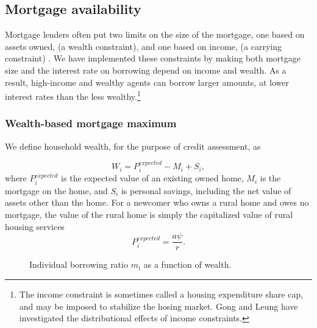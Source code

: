  {\color{black}

\subsection{Mortgage availability} \label{sec:mortgage-availability}
Mortgage lenders often put two limits on the size of the mortgage, one based on assets owned, (a {wealth constraint}), and one based on income, (a {carrying constraint}) \cite{CanadaHousingSupply2022}. We have implemented these constraints by making both mortgage size and the interest rate on borrowing depend on income and wealth. As a result, high-income and wealthy agents can borrow larger amounts, at lower interest rates than the less wealthy.\footnote{The income constraint is sometimes called a housing expenditure share cap, and may be imposed to stabilize the hosing market. Gong and Leung \cite{yifangongDoesSpaceMatter2003} have investigated the distributional effects of income constraints.} %


\subsubsection{Wealth-based mortgage maximum} 
We define household wealth, for the purpose of credit assessment, as

\begin{equation} 
W_i= P^{expected}_i - M_i  +S_i, 
\end{equation}
where $P^{expected}_i$ is the expected value of an existing owned home, $M_i$ is the mortgage on the home, and $S_i$ is personal savings, including the net value of assets other than the home. %
For a newcomer who owns a rural home and owes no mortgage, the value of the rural home is simply the capitalized value of rural housing services
\begin{equation} 
P^{expected}_i = \frac{a\psi}{r}.
\end{equation}


    \begin{figure}[htb]
    \begin{center}
    
    \end{center}
    \caption[Individual borrowing ratio $m_i$ as a function of wealth]{Individual borrowing ratio $m_i$ as a function of wealth.}
    \label{fig-borrowing-ratio}
    \end{figure}


}
